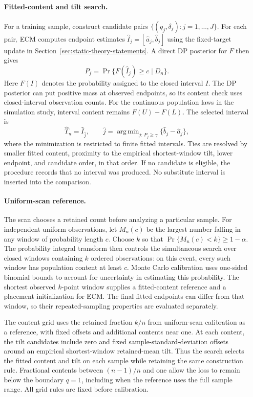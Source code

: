 \documentclass[11pt]{article}
\numberwithin{equation}{section}
\DeclareMathOperator{\argmin}{arg\,min}
\begin{document}
\paragraph{Fitted-content and tilt search.}
For a training sample, construct candidate pairs
\(\{(q_j,\delta_j):j=1,\ldots,J\}\). For each pair, ECM
computes endpoint estimates
\(\widehat I_j=[\widehat a_j,\widehat b_j]\) using the fixed-target update
in Section~\ref{sec:static-theory-statements}. A direct DP posterior for \(F\)
then gives
\[
P_j=\Pr\{F(\widehat I_j)\ge c\mid D_n\}.
\]
Here \(F(I)\) denotes the probability assigned to the closed interval
\(I\). The DP posterior can put positive mass at observed endpoints, so its
content check uses closed-interval observation counts. For the continuous
population laws in the simulation study, interval content remains
\(F(U)-F(L)\).
The selected interval is
\[
\widehat T_n=\widehat I_{\widehat j},\qquad
\widehat j=\argmin_{j:\,P_j\ge\gamma}
\{\widehat b_j-\widehat a_j\},
\]
where the minimization is restricted to finite fitted intervals. Ties are
resolved by smaller fitted content, proximity to the empirical shortest-window
tilt, lower endpoint, and candidate order, in that order. If no candidate is
eligible, the procedure records that no interval was produced. No substitute
interval is inserted into the comparison.

\paragraph{Uniform-scan reference.}
The scan chooses a retained count before analyzing a particular sample.
For independent uniform observations, let \(M_n(c)\) be the largest number
falling in any window of probability length \(c\). Choose \(k\) so that
\(\Pr\{M_n(c)<k\}\ge1-\alpha\). The probability integral transform then
controls the simultaneous search over closed windows containing \(k\)
ordered observations: on this event, every such window has population content
at least \(c\). Monte Carlo calibration uses one-sided binomial bounds to
account for uncertainty in estimating this probability. The shortest observed
\(k\)-point window supplies a fitted-content reference and a placement
initialization for ECM. The final fitted endpoints can differ from that
window, so their repeated-sampling properties are evaluated separately.

The content grid uses the retained fraction \(k/n\) from uniform-scan
calibration as a reference, with fixed offsets and additional contents near
one. At each content, the tilt candidates include zero and fixed
sample-standard-deviation offsets around an empirical shortest-window
retained-mean tilt. Thus the search selects the fitted content and tilt on
each sample while retaining the same construction rule.
Fractional contents between \((n-1)/n\) and one allow the loss to
remain below the boundary \(q=1\), including when the reference uses the full
sample range. All grid rules are fixed before calibration.
\end{document}
